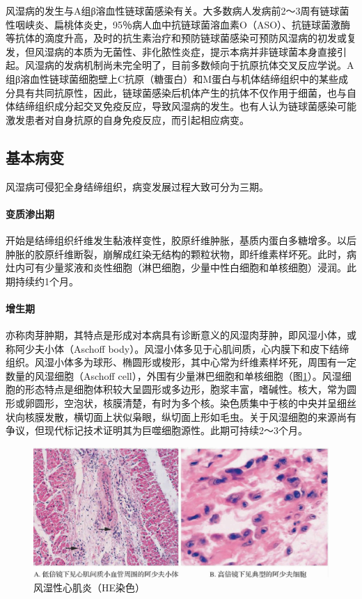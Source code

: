 风湿病的发生与A组β溶血性链球菌感染有关。大多数病人发病前2～3周有链球菌性咽峡炎、扁桃体炎史，95％病人血中抗链球菌溶血素O（ASO）、抗链球菌激酶等抗体的滴度升高，及时的抗生素治疗和预防链球菌感染可预防风湿病的初发或复发，但风湿病的本质为无菌性、非化脓性炎症，提示本病并非链球菌本身直接引起。风湿病的发病机制尚未完全明了，目前多数倾向于抗原抗体交叉反应学说。A组β溶血性链球菌细胞壁上C抗原（糖蛋白）和M蛋白与机体结缔组织中的某些成分具有共同抗原性，因此，链球菌感染后机体产生的抗体不仅作用于细菌，也与自体结缔组织成分起交叉免疫反应，导致风湿病的发生。也有人认为链球菌感染可能激发患者对自身抗原的自身免疫反应，而引起相应病变。

\subsection{基本病变}

风湿病可侵犯全身结缔组织，病变发展过程大致可分为三期。

\paragraph{变质渗出期}
开始是结缔组织纤维发生黏液样变性，胶原纤维肿胀，基质内蛋白多糖增多。以后肿胀的胶原纤维断裂，崩解成红染无结构的颗粒状物，即纤维素样坏死。此时，病灶内可有少量浆液和炎性细胞（淋巴细胞，少量中性白细胞和单核细胞）浸润。此期持续约1个月。

\paragraph{增生期}
亦称肉芽肿期，其特点是形成对本病具有诊断意义的风湿肉芽肿，即风湿小体，或称阿少夫小体（Aschoff
body）。风湿小体多见于心肌间质，心内膜下和皮下结缔组织。风湿小体多为球形、椭圆形或梭形，其中心常为纤维素样坏死，周围有一定数量的风湿细胞（Aschoff
cell），外围有少量淋巴细胞和单核细胞（图\ref{fig6-10}）。风湿细胞的形态特点是细胞体积较大呈圆形或多边形，胞浆丰富，嗜碱性。核大，常为圆形或卵圆形，空泡状，核膜清楚，有时为多个核。染色质集中于核的中央并呈细丝状向核膜发散，横切面上状似枭眼，纵切面上形如毛虫。关于风湿细胞的来源尚有争议，但现代标记技术证明其为巨噬细胞源性。此期可持续2～3个月。

\begin{figure}[!htbp]
    \centering
    \includegraphics{./images/Image00102.jpg}
    \captionsetup{justification=centering}
    \caption{风湿性心肌炎（HE染色）}
    \label{fig6-10}
\end{figure}

